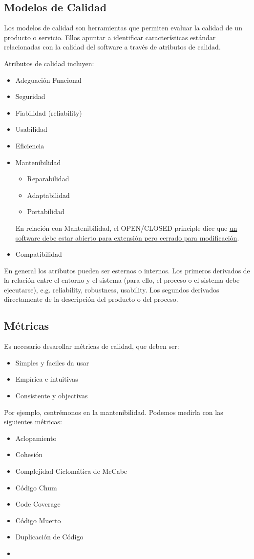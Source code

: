 \subsection{Modelos de Calidad}
Los modelos de calidad son herramientas que permiten evaluar la calidad de un producto o servicio. Ellos apuntar a identificar características estándar relacionadas con la
calidad del software a través de atributos de calidad.
{Atributos de calidad incluyen:\ns
\begin{itemize}
   \item Adeguación Funcional
   \item Seguridad
   \item Fiabilidad (reliability)
   \item Usabilidad
   \item Eficiencia
   \item Mantenibilidad
   \begin{itemize}
      \item Reparabilidad
      \item Adaptabilidad
      \item Portabilidad
   \end{itemize}
   En relación con Mantenibilidad, el OPEN/CLOSED principle dice que \ul{un software debe estar abierto para extensión pero cerrado para modificación}. 
   \item Compatibilidad
\end{itemize}
}

En general los atributos pueden ser esternos o internos. Los primeros derivados de la relación entre el entorno y el sistema (para ello, el proceso o el sistema debe ejecutarse), e.g. reliability, robustness, usability. Los segundos derivados directamente de la descripción del producto o del proceso.

\subsection{Métricas}
{Es necesario desarollar métricas de calidad, que deben ser:\ns
\begin{itemize}
   \item Simples y faciles da usar
   \item Empírica e intuitivas
   \item Consistente y objectivas
\end{itemize}}

Por ejemplo, centrémonos en la mantenibilidad. Podemos medirla con las siguientes métricas:
\begin{itemize}
   \item Aclopamiento
   \item Cohesión
   \item Complejidad Ciclomática de McCabe
   \item Código Chum
   \item Code Coverage
   \item Código Muerto
   \item Duplicación de Código
   \item 
\end{itemize}
